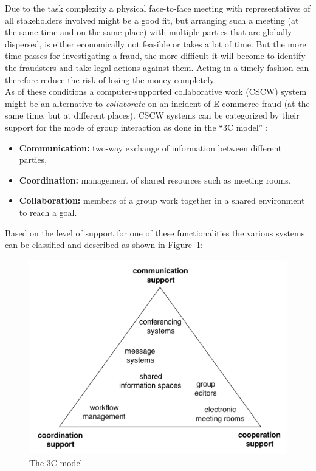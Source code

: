 Due to the task complexity a physical face-to-face meeting with representatives of all stakeholders involved might be a good fit, but arranging such a meeting (at the same time and on the same place) with multiple parties that are globally dispersed, is either economically not feasible or takes a lot of time. But the more time passes for investigating a fraud, the more difficult it will become to identify the fraudsters and take legal actions against them. Acting in a timely fashion can therefore reduce the risk of losing the money completely. \\

As of these conditions a computer-supported collaborative work (\gls{CSCW}) system might be an alternative to \emph{collaborate} on an incident of \gls{E-commerce} fraud (at the same time, but at different places). \gls{CSCW} systems can be categorized by their support for the mode of group interaction as done in the ``3C model'' \citep{Koch2008}: \@

\begin{itemize}
    \item\textbf{Communication:} two-way exchange of information between different parties,
    \item\textbf{Coordination:} management of shared resources such as meeting rooms,
    \item\textbf{Collaboration:} members of a group work together in a shared environment to reach a goal.
\end{itemize}

Based on the level of support for one of these functionalities the various systems can be classified and described as shown in Figure~\ref{fig:images_3C_model}: \@

\begin{figure}[H]
	\centering
		\includegraphics[width=0.9\columnwidth]{images/3C-model.png}
	\caption[The 3C model]{The 3C model \citep{Koch2008}}
\label{fig:images_3C_model}
\end{figure}

